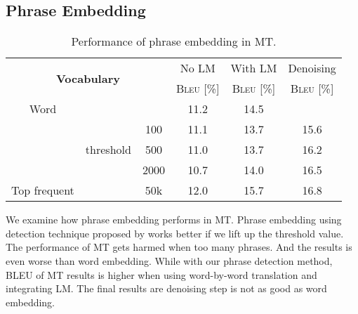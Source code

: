 \subsection{Phrase Embedding}

\begin{table}[h]
	\centering
	\begin{tabular}{ccccc  c}
		\hline
		\multicolumn{3}{c}{\multirow{2}{*}{\textbf{Vocabulary}}}                  & No LM & With LM & Denoising \\
		\multicolumn{3}{c}{}                                         &  \textsc{Bleu} [\%]  &  \textsc{Bleu} [\%] & \textsc{Bleu} [\%]   \\ \hline
		Word            & \multicolumn{2}{l}{}              & 11.2 & 14.5  &\leavevmode\color{blue}{ 17.2} \\
		\hline
		\multirow{3}{*}{\cite{mikolov2013distributed} } & \multirow{3}{*}{threshold} & 100  & 11.1 & 13.7  & 15.6 \\ \cline{3-6} 
		&                            & 500  & 11.0 & 13.7  & 16.2 \\ \cline{3-6} 
		&                            & 2000 & 10.7 & 14.0  &16.5 \\ \hline
		Top frequent              & \multicolumn{1}{l}{\text{count}}  & 50k  & \leavevmode\color{blue}12.0 & \leavevmode\color{blue}15.7  & 16.8 \\ \hline
	\end{tabular}
	\caption{Performance of phrase embedding in MT.}
\end{table}
We examine how phrase embedding performs in MT. Phrase embedding using detection technique proposed by \cite{mikolov2013distributed} works better if we lift up the threshold value. The performance of MT gets harmed when too many phrases. And the results is even worse than word embedding.  While with our phrase detection method, BLEU of MT results is higher when using word-by-word translation and integrating LM. The final results are denoising step is not as good as word embedding. 


